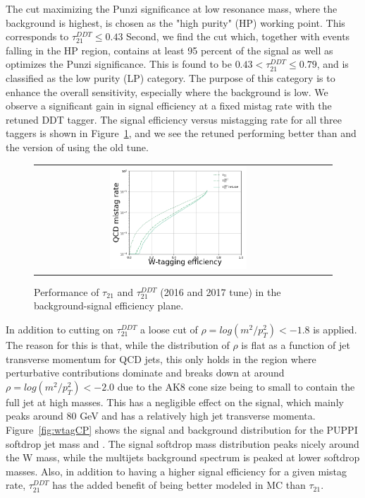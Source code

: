The cut maximizing the Punzi significance at low resonance mass, where the background is highest, is chosen as the "high purity" (HP) working point.
This corresponds to $\tau_{21}^{DDT} \leq 0.43$
Second, we find the cut which, together with events falling in the HP region, contains at least 95 percent of the signal as well as optimizes the Punzi significance. This is found to be $0.43<\tau_{21}^{DDT}\leq0.79$, and is classified as the low purity (LP) category. The purpose of this category is to enhance the overall sensitivity, especially where the background is low.
We observe a significant gain in signal efficiency at a fixed mistag rate with the retuned DDT tagger. The signal efficiency versus mistagging rate for all three taggers is shown in Figure~\ref{fig:roc}, and we see the retuned \ddt performing better than \nsubj and the version of \ddt using the old tune.
\begin{figure}[htbp]
\centering
\begin{tabular}{cc}
\includegraphics[width=0.49\textwidth]{figures/analysis/search3/AN-17-303/vtag/LoLa-comp-roc-simple.png}
\end{tabular}
\caption{Performance of $\tau_{21}$ and $\tau_{21}^{DDT}$ (2016 and 2017 tune) in the background-signal efficiency plane.}
\label{fig:roc}
\end{figure}
In addition to cutting on $\tau_{21}^{DDT}$ a loose cut of $\rho = log(m^2/p_T^2) < -1.8 $ is applied.
The reason for this is that, while the distribution of $\rho$ is flat as a function of jet transverse momentum for QCD jets, this only holds in the region where perturbative contributions dominate and breaks down at around $\rho = log(m^2/p_T^2) < -2.0$ due to the AK8 cone size being to small to contain the full jet at high masses. This has a negligible effect on the signal, which
mainly peaks around 80 GeV and has a relatively high jet transverse momenta.
Figure~\ref{fig:wtagCP} shows the signal and background distribution for the PUPPI softdrop jet mass and \ddt. The signal softdrop mass distribution peaks nicely around the W mass, while the multijets background spectrum is peaked at lower softdrop masses. Also, in addition to having a higher signal efficiency for a given mistag rate, $\tau_{21}^{DDT}$ has the added benefit of being better modeled in MC than $\tau_{21}$.
